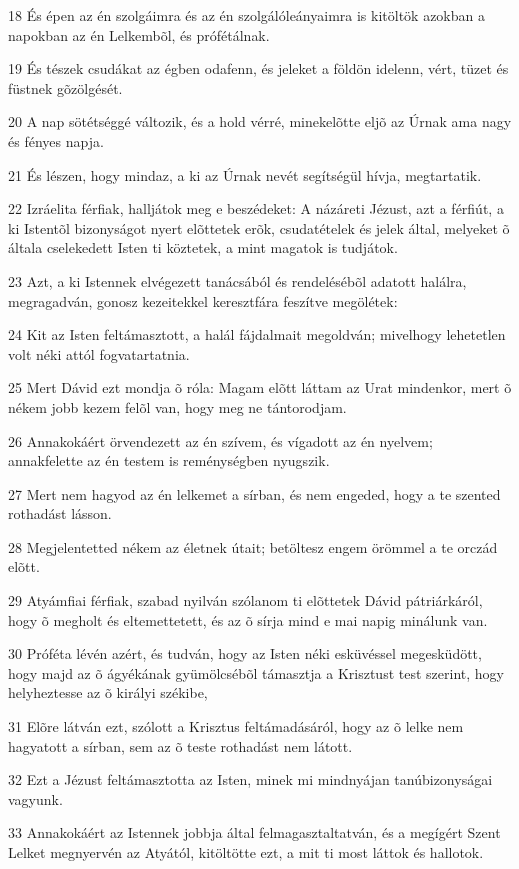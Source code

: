 \par 18 És épen az én szolgáimra és az én szolgálóleányaimra is kitöltök azokban a napokban az én Lelkembõl, és prófétálnak.
\par 19 És tészek csudákat az égben odafenn, és jeleket a földön idelenn, vért, tüzet és füstnek gõzölgését.
\par 20 A nap sötétséggé változik, és a hold vérré, minekelõtte eljõ az Úrnak ama nagy és fényes napja.
\par 21 És lészen, hogy mindaz, a ki az Úrnak nevét segítségül hívja, megtartatik.
\par 22 Izráelita férfiak, halljátok meg e beszédeket: A názáreti Jézust, azt a férfiút, a ki Istentõl bizonyságot nyert elõttetek erõk, csudatételek és jelek által, melyeket õ általa cselekedett Isten ti köztetek, a mint magatok is tudjátok.
\par 23 Azt, a ki Istennek elvégezett tanácsából és rendelésébõl adatott halálra, megragadván, gonosz kezeitekkel keresztfára feszítve megölétek:
\par 24 Kit az Isten feltámasztott, a halál fájdalmait megoldván; mivelhogy lehetetlen volt néki attól fogvatartatnia.
\par 25 Mert Dávid ezt mondja õ róla: Magam elõtt láttam az Urat mindenkor, mert õ nékem jobb kezem felõl van, hogy meg ne tántorodjam.
\par 26 Annakokáért örvendezett az én szívem, és vígadott az én nyelvem; annakfelette az én testem is reménységben nyugszik.
\par 27 Mert nem hagyod az én lelkemet a sírban, és nem engeded, hogy a te szented rothadást lásson.
\par 28 Megjelentetted nékem az életnek útait; betöltesz engem örömmel a te orczád elõtt.
\par 29 Atyámfiai férfiak, szabad nyilván szólanom ti elõttetek Dávid pátriárkáról, hogy õ megholt és eltemettetett, és az õ sírja mind e mai napig minálunk van.
\par 30 Próféta lévén azért, és tudván, hogy az Isten néki esküvéssel megesküdött, hogy majd az õ ágyékának gyümölcsébõl támasztja a Krisztust test szerint, hogy helyheztesse az õ királyi székibe,
\par 31 Elõre látván ezt, szólott a Krisztus feltámadásáról, hogy az õ lelke nem hagyatott a sírban, sem az õ teste rothadást nem látott.
\par 32 Ezt a Jézust feltámasztotta az Isten, minek mi mindnyájan tanúbizonyságai vagyunk.
\par 33 Annakokáért az Istennek jobbja által felmagasztaltatván, és a megígért Szent Lelket megnyervén az Atyától, kitöltötte ezt, a mit ti most láttok és hallotok.
